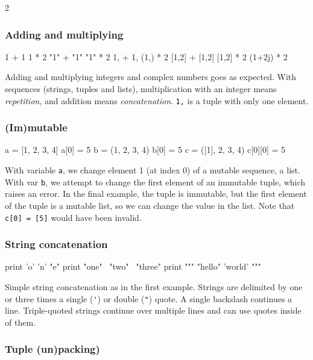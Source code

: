 \documentclass[draft=false]{article}
\newcommand{\answer}[1]{#1}%
\def\pythoni{\lstinline[language=pythontim]}
\begin{document}
\begin{multicols}{2}

\subsubsection{Adding and multiplying}

\begin{python}
1 + 1
1 * 2
"1" + "1"
"1" * 2
1, + 1,
(1,) * 2
[1,2] + [1,2]
[1,2] * 2
(1+2j) * 2
\end{python}
\answer{Adding and multiplying integers and complex numbers goes as expected. With sequences (strings, tuples and lists), multiplication with an integer means \emph{repetition}, and addition means \emph{concatenation}. \pythoni{1,} is a tuple with only one element.}
\subsubsection{(Im)mutable}

\begin{python}
a = [1, 2, 3, 4]
a[0] = 5
b = (1, 2, 3, 4)
b[0] = 5
c = ([1], 2, 3, 4)
c[0][0] = 5
\end{python}
\answer{With variable \pythoni{a}, we change element 1 (at index 0) of a mutable sequence, a list. With var \pythoni{b}, we attempt to change the first element of an immutable tuple, which raises an error. In the final example, the tuple is immutable, but the first element of the tuple is a mutable list, so we can change the value in the list. Note that \pythoni{c[0] = [5]} would have been invalid.}

\columnbreak

\subsubsection{String concatenation}
\begin{python}
print 'o' 'n' "e"
print "one" \
"two" \
"three"
print """
"hello"
'world'
"""
\end{python}

\answer{Simple string concatenation as in the first example. Strings are delimited by one or three times a single (\pythoni{'}) or double (\pythoni{"}) quote. A single backslash continues a line. Triple-quoted strings continue over multiple lines and can use quotes inside of them.}

\subsubsection{Tuple (un)packing)}


\end{multicols}
\end{document}

